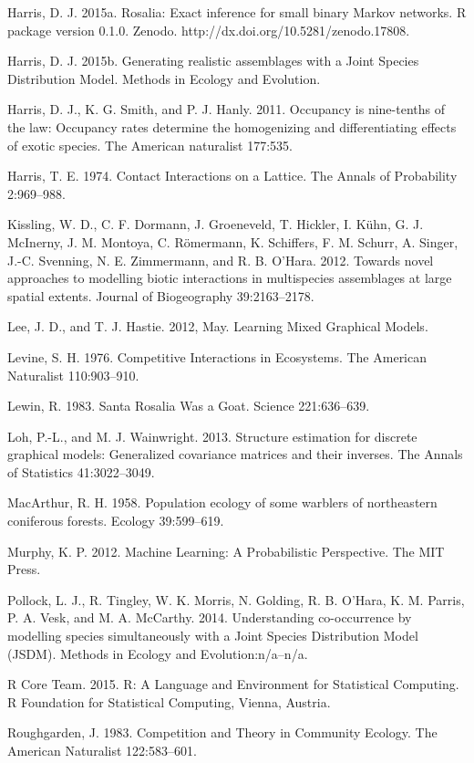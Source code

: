 \documentclass[12pt,]{article}
\begin{document}
\begin{spacing}{1.9}
\begin{flushleft}
Harris, D. J. 2015a. Rosalia: Exact inference for small binary Markov
networks. R package version 0.1.0. Zenodo.
http://dx.doi.org/10.5281/zenodo.17808.

Harris, D. J. 2015b. Generating realistic assemblages with a Joint
Species Distribution Model. Methods in Ecology and Evolution.

Harris, D. J., K. G. Smith, and P. J. Hanly. 2011. Occupancy is
nine-tenths of the law: Occupancy rates determine the homogenizing and
differentiating effects of exotic species. The American naturalist
177:535.

Harris, T. E. 1974. Contact Interactions on a Lattice. The Annals of
Probability 2:969--988.

Kissling, W. D., C. F. Dormann, J. Groeneveld, T. Hickler, I. Kühn, G.
J. McInerny, J. M. Montoya, C. Römermann, K. Schiffers, F. M. Schurr, A.
Singer, J.-C. Svenning, N. E. Zimmermann, and R. B. O'Hara. 2012.
Towards novel approaches to modelling biotic interactions in
multispecies assemblages at large spatial extents. Journal of
Biogeography 39:2163--2178.

Lee, J. D., and T. J. Hastie. 2012, May. Learning Mixed Graphical
Models.

Levine, S. H. 1976. Competitive Interactions in Ecosystems. The American
Naturalist 110:903--910.

Lewin, R. 1983. Santa Rosalia Was a Goat. Science 221:636--639.

Loh, P.-L., and M. J. Wainwright. 2013. Structure estimation for
discrete graphical models: Generalized covariance matrices and their
inverses. The Annals of Statistics 41:3022--3049.

MacArthur, R. H. 1958. Population ecology of some warblers of
northeastern coniferous forests. Ecology 39:599--619.

Murphy, K. P. 2012. Machine Learning: A Probabilistic Perspective. The
MIT Press.

Pollock, L. J., R. Tingley, W. K. Morris, N. Golding, R. B. O'Hara, K.
M. Parris, P. A. Vesk, and M. A. McCarthy. 2014. Understanding
co-occurrence by modelling species simultaneously with a Joint Species
Distribution Model (JSDM). Methods in Ecology and Evolution:n/a--n/a.

R Core Team. 2015. R: A Language and Environment for Statistical
Computing. R Foundation for Statistical Computing, Vienna, Austria.

Roughgarden, J. 1983. Competition and Theory in Community Ecology. The
American Naturalist 122:583--601.


\end{flushleft}
\end{spacing}
\end{document}
